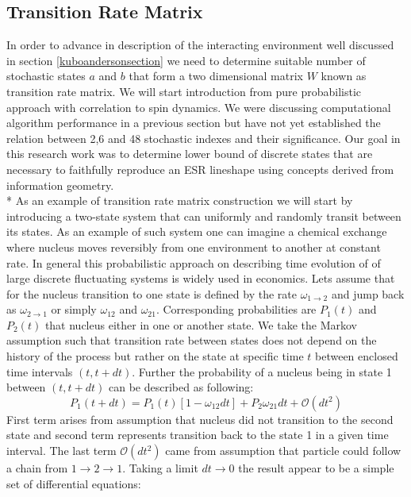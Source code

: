 \subsection{Transition Rate Matrix}\label{trmsection}
In order to advance in description of the interacting environment well discussed in section \ref{kuboandersonsection} we need to determine suitable number of stochastic states $a$ and $b$ that form a two dimensional matrix $W$ known as transition rate matrix. We will start introduction from pure probabilistic approach with correlation to spin dynamics. We were discussing computational algorithm performance in a previous section but have not yet established the relation between 2,6 and 48 stochastic indexes and their significance. Our goal in this research work was to determine lower bound of discrete states that are necessary to faithfully reproduce an ESR lineshape using concepts derived from information geometry\cite{Earle2009}.\\*
As an example of transition rate matrix construction we will start by introducing a two-state system that can uniformly and randomly transit between its states. As an example of such system one can imagine a chemical exchange where nucleus moves reversibly from one environment to another at constant rate. In general this probabilistic approach on describing time evolution of of large discrete fluctuating systems is widely used in economics\cite{Weidlich1992}. Lets assume that for the nucleus transition to one state is defined by the rate $\omega_{1\rightarrow2}$ and jump back as $\omega_{2\rightarrow1}$ or simply $\omega_{12}$ and $\omega_{21}$. Corresponding probabilities are $P_{1}(t)$ and $P_{2}(t)$ that nucleus either in one or another state. We take the Markov assumption such that transition rate between states does not depend on the history of the process but rather on the state at specific time $t$ between enclosed time intervals $(t,t+dt)$. Further the probability of a nucleus being in state 1 between $(t,t+dt)$ can be described as following: 
\begin{equation}\label{eq:premaster}
P_{1}(t+dt)=P_{1}(t)[1-\omega_{12}dt]+P_{2}\omega_{21}dt+\mathcal{O}(dt^2)
\end{equation} 
First term arises from assumption that nucleus did not transition to the second state and second term represents transition back to the state 1 in a given time interval. The last term $\mathcal{O}(dt^2)$ came from assumption that particle could follow a chain from $1\rightarrow 2 \rightarrow 1$. Taking a limit $dt\rightarrow 0$ the result appear to be a simple set of differential equations: 
